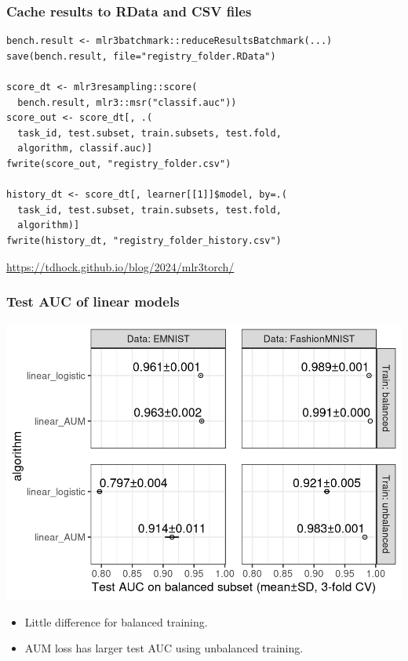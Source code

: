 \documentclass{beamer}
\begin{document}
\begin{frame}[fragile]
  \frametitle{Cache results to RData and CSV files}
\begin{verbatim}
bench.result <- mlr3batchmark::reduceResultsBatchmark(...)
save(bench.result, file="registry_folder.RData")

score_dt <- mlr3resampling::score(
  bench.result, mlr3::msr("classif.auc"))
score_out <- score_dt[, .(
  task_id, test.subset, train.subsets, test.fold,
  algorithm, classif.auc)]
fwrite(score_out, "registry_folder.csv")

history_dt <- score_dt[, learner[[1]]$model, by=.(
  task_id, test.subset, train.subsets, test.fold,
  algorithm)]
fwrite(history_dt, "registry_folder_history.csv")
\end{verbatim}
  \url{https://tdhock.github.io/blog/2024/mlr3torch/}
\end{frame}

\begin{frame}
  \frametitle{Test AUC of linear models}
  \includegraphics[width=\textwidth]{2025-04-04-nnet_prop0.01-test-auc}
  \vskip -0.2cm
  \begin{itemize}
  \item Little difference for balanced training.
  \item AUM loss has larger test AUC using unbalanced training.
  \end{itemize}
\end{frame}
\end{document}
